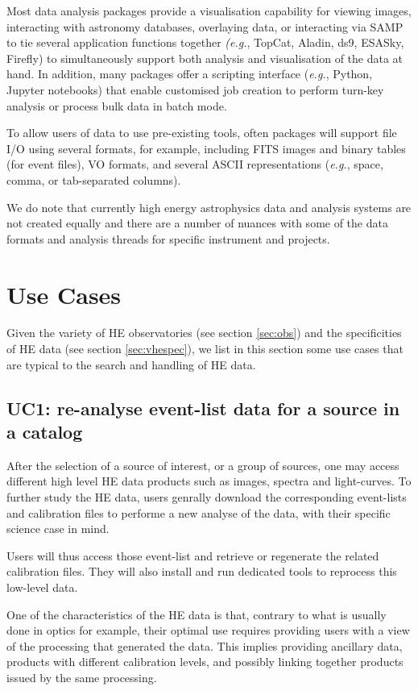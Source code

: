 \documentclass[11pt,a4paper]{ivoa}
\begin{document}
{Most data analysis packages provide a visualisation capability for viewing images, interacting with astronomy databases, overlaying data, or interacting via SAMP to tie several application functions together {\em (e.g.\/}, TopCat, Aladin, ds9, ESASky, Firefly) to simultaneously support both analysis and visualisation of the data at hand.  In addition, many packages offer a scripting interface ({\em e.g.\/}, Python, Jupyter notebooks) that enable customised job creation to perform turn-key analysis or process bulk data in batch mode.

To allow users of data to use pre-existing tools, often packages will support file I/O using several formats, for example, including \gls{FITS} images and binary tables (for event files), \gls{VO} formats, and several ASCII representations ({\em e.g.\/}, space, comma, or tab-separated columns).

We do note that currently high energy astrophysics data and analysis systems are not created equally and there are a number of nuances with some of the data formats and analysis threads for specific instrument and projects.


\section{Use Cases}

Given the variety of \gls{HE} observatories (see section \ref{sec:obs}) and the specificities of \gls{HE} data (see section \ref{sec:vhespec}), we list in this section some use cases that are typical to the search and handling of \gls{HE} data.

\subsection{UC1: re-analyse event-list data for a source in a catalog}

After the selection of a source of interest, or a group of sources, one may access different high level \gls{HE} data products such as
images, spectra and light-curves. To further study the \gls{HE} data, users genrally download the corresponding event-lists and calibration files to performe a new analyse of the data, with their specific science case in mind.

Users will thus access those event-list and retrieve or regenerate the related calibration files. They will also install and run dedicated tools to reprocess this low-level data.

One of the characteristics of the \gls{HE} data is that, contrary to what is usually done in optics for example, their optimal
use requires providing users with a view of the processing that generated the data. This implies providing ancillary data,
products with different calibration levels, and possibly linking together products issued by the same processing.


}
\end{document}
